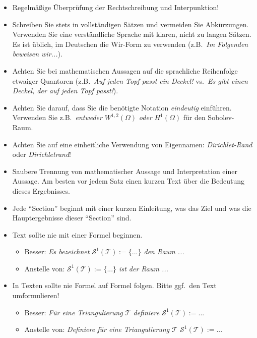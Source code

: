 \documentclass[a4paper,11pt,bibliography=totoc,listof=totoc,headinclude=true,cleardoublepage=empty,oneside]{scrbook}
\begin{document}
{\color{change}
\begin{itemize}

\item Regelmäßige Überprüfung der Rechtschreibung und Interpunktion!
\item Schreiben Sie stets in vollständigen Sätzen und vermeiden Sie Abkürzungen.  Verwenden Sie eine verständliche Sprache mit klaren, nicht zu langen Sätzen. Es ist üblich, im Deutschen die Wir-Form zu verwenden (z.B.\ \emph{Im Folgenden beweisen wir...}).

\item Achten Sie bei mathematischen Aussagen auf die sprachliche Reihenfolge etwaiger Quantoren (z.B.\ \emph{Auf jeden Topf passt ein Deckel!} vs.\ \emph{Es gibt einen Deckel, der auf jeden Topf passt!}).

\item Achten Sie darauf, dass Sie die benötigte Notation \emph{eindeutig} einführen. Verwenden Sie z.B.\ \emph{entweder} $W^{1,2}(\Omega)$ \emph{oder} $H^1(\Omega)$ für den Sobolev-Raum.

\item Achten Sie auf eine einheitliche Verwendung von Eigennamen: \emph{Dirichlet-Rand} oder \emph{Dirichletrand}!

\item Saubere Trennung von mathematischer Aussage und Interpretation einer Aussage. Am besten vor jedem Satz einen kurzen Text über die Bedeutung dieses Ergebnisses.
\item Jede "`Section"' beginnt mit einer kurzen Einleitung, was das Ziel und was die Hauptergebnisse dieser "`Section"' sind.

\item Text sollte nie mit einer Formel beginnen.
\begin{itemize}
\item Besser: \emph{Es bezeichnet $\mathcal{S}^1(\mathcal{T}) := \big\{ ... \big\}$ den Raum ...}
\item Anstelle von: \emph{$\mathcal{S}^1(\mathcal{T}) := \big\{ ... \big\}$ ist der Raum ...}
\end{itemize}

\item In Texten sollte nie Formel auf Formel folgen. Bitte ggf.\ den Text umformulieren!
\begin{itemize}
\item Besser: \emph{Für eine Triangulierung $\mathcal{T}$ definiere $\mathcal{S}^1(\mathcal{T}) := ...$}
\item Anstelle von: \emph{Definiere für eine Triangulierung $\mathcal{T}$ $\mathcal{S}^1(\mathcal{T}) := ...$}
\end{itemize}


\end{itemize}}
\end{document}
